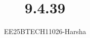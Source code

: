 \documentclass[journal]{IEEEtran}
\begin{document}

\vspace{3cm}

\title{9.4.39}
\author{EE25BTECH11026-Harsha}
 \maketitle
{\let\newpage\relax\maketitle}

\renewcommand{\thefigure}{\theenumi}
\renewcommand{\thetable}{\theenumi}
\setlength{\intextsep}{10pt} %


\renewcommand{\thetable}{\theenumi}
\end{document}
